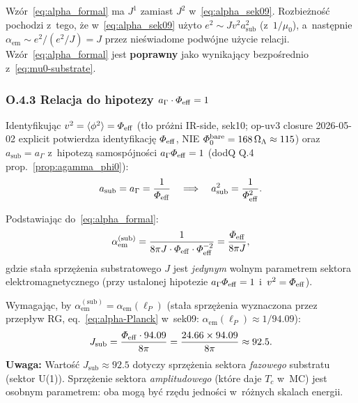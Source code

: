 \begin{uwaga}
\label{rem:alpha_discrepancy}
Wzór~\eqref{eq:alpha_formal} ma $J^1$ zamiast $J^2$ w~\eqref{eq:alpha_sek09}.
Rozbieżność pochodzi z~tego, że w~\eqref{eq:alpha_sek09} użyto
$e^2 \sim Jv^2 a_\mathrm{sub}^2$ (z~$1/\mu_0$), a~następnie
$\alpha_\mathrm{em} \sim e^2/(e^2/J) = J$ przez nieświadome
podwójne użycie relacji. Wzór~\eqref{eq:alpha_formal} jest
\textbf{poprawny} jako wynikający bezpośrednio z~\eqref{eq:mu0-substrate}.
\end{uwaga}

\subsubsection*{O.4.3 Relacja do hipotezy $a_\Gamma \cdot \Phi_{\rm eff} = 1$}

Identyfikując $v^2 = \langle\phi^2\rangle = \Phi_{\rm eff}$
(t\l{}o pr\'o\.zni IR-side, sek10; op-uv3 closure 2026-05-02
explicit potwierdza identyfikacj\k{e} $\Phi_{\rm eff}$, NIE
$\Phi_0^{\rm bare} = 168\,\Omega_\Lambda \approx 115$)
oraz $a_\mathrm{sub} = a_\Gamma$ z~hipotezą samospójności
$a_\Gamma\Phi_{\rm eff} = 1$ (dodQ Q.4 prop.~\ref{prop:agamma_phi0}):
\begin{equation}
  a_\mathrm{sub} = a_\Gamma = \frac{1}{\Phi_{\rm eff}}
  \quad\Longrightarrow\quad
  a_\mathrm{sub}^2 = \frac{1}{\Phi_{\rm eff}^2}.
  \label{eq:asub_from_phi0}
\end{equation}

Podstawiając do~\eqref{eq:alpha_formal}:
\begin{equation}
  \alpha_\mathrm{em}^\mathrm{(sub)}
  = \frac{1}{8\pi J \cdot \Phi_{\rm eff} \cdot \Phi_{\rm eff}^{-2}}
  = \frac{\Phi_{\rm eff}}{8\pi J},
  \label{eq:alpha_UV}
\end{equation}
gdzie stała sprzężenia substratowego $J$ jest \emph{jedynym} wolnym
parametrem sektora elektromagnetycznego (przy ustalonej hipotezie
$a_\Gamma\Phi_{\rm eff} = 1$ i~$v^2 = \Phi_{\rm eff}$).

\begin{propozycja}
\label{prop:J_from_alpha}
Wymagając, by $\alpha_\mathrm{em}^\mathrm{(sub)} = \alpha_\mathrm{em}(\ell_P)$
(stała sprzężenia wyznaczona przez przepływ RG, eq.~\eqref{eq:alpha-Planck}
w~sek09: $\alpha_\mathrm{em}(\ell_P) \approx 1/94.09$):
\begin{equation}
  J_\mathrm{sub}
  = \frac{\Phi_{\rm eff} \cdot 94.09}{8\pi}
  = \frac{24.66 \times 94.09}{8\pi}
  \approx 92.5.
  \label{eq:J_from_alpha}
\end{equation}
\textbf{Uwaga:} Wartość $J_\mathrm{sub} \approx 92.5$ dotyczy
sprzężenia sektora \emph{fazowego} substratu (sektor U(1)).
Sprzężenie sektora \emph{amplitudowego} (które daje $T_c$ w~MC)
jest osobnym parametrem: oba mogą być rzędu jedności
w~różnych skalach energii.
\end{propozycja}

